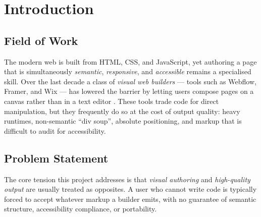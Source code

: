 
\chapter{Introduction}
\label{ch:introduction}

\section{Field of Work}
The modern web is built from HTML, CSS, and JavaScript, yet authoring a page that
is simultaneously \emph{semantic}, \emph{responsive}, and \emph{accessible}
remains a specialised skill. Over the last decade a class of \emph{visual web
builders} --- tools such as Webflow, Framer, and Wix --- has lowered the barrier
by letting users compose pages on a canvas rather than in a text editor
\cite{webflow,framer,wix}. These tools trade code for direct manipulation, but
they frequently do so at the cost of output quality: heavy runtimes, non-semantic
``div soup'', absolute positioning, and markup that is difficult to audit for
accessibility.


\section{Problem Statement}
The core tension this project addresses is that \emph{visual authoring} and
\emph{high-quality output} are usually treated as opposites. A user who cannot
write code is typically forced to accept whatever markup a builder emits, with no
guarantee of semantic structure, accessibility compliance, or portability.

